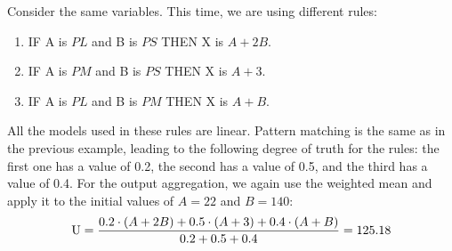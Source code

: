 \begin{example}
    Consider the same variables. 
    This time, we are using different rules:
    \begin{enumerate}
        \item IF A is $PL$ and B is $PS$ THEN X is $A+2B$.
        \item IF A is $PM$ and B is $PS$ THEN X is $A+3$. 
        \item IF A is $PL$ and B is $PM$ THEN X is $A+B$.
    \end{enumerate}
    All the models used in these rules are linear. 
    Pattern matching is the same as in the previous example, leading to the following degree of truth for the rules: the first one has a value of 0.2, the second has a value of 0.5, and the third has a value of 0.4.
    For the output aggregation, we again use the weighted mean and apply it to the initial values of $A=22$ and $B=140$:
    \[\textnormal{U}=\dfrac{0.2 \cdot (A+2B)+0.5 \cdot (A+3)+ 0.4 \cdot (A+B)}{0.2+0.5+0.4}=125.18\]
\end{example}